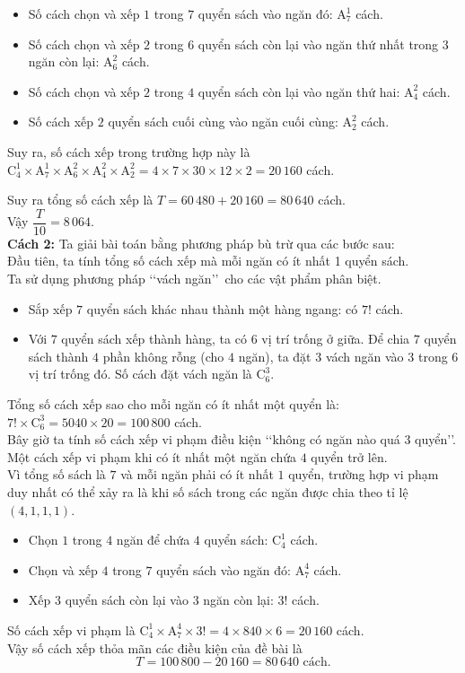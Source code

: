\begin{ex}
{\begin{enumerate}[TH 1.]
\begin{itemize}
\item Số cách chọn và xếp $1$ trong $7$ quyển sách vào ngăn đó: $\mathrm{A}_7^1$ cách.
\item Số cách chọn và xếp $2$ trong $6$ quyển sách còn lại vào ngăn thứ nhất trong $3$ ngăn còn lại: $\mathrm{A}_6^2$ cách.
\item Số cách chọn và xếp $2$ trong $4$ quyển sách còn lại vào ngăn thứ hai: $\mathrm{A}_4^2$ cách.
\item Số cách xếp $2$ quyển sách cuối cùng vào ngăn cuối cùng: $\mathrm{A}_2^2$ cách.
\end{itemize}
Suy ra, số cách xếp trong trường hợp này là $\mathrm{C}_4^1 \times \mathrm{A}_7^1 \times \mathrm{A}_6^2 \times \mathrm{A}_4^2 \times \mathrm{A}_2^2 = 4 \times 7 \times 30 \times 12 \times 2 = 20\,160$ cách.
\end{enumerate}
Suy ra tổng số cách xếp là $T=60\,480 + 20\,160 = 80\,640$ cách.\\
Vậy $\dfrac{T}{10}=8\,064$.\\
\textbf{Cách 2:} Ta giải bài toán bằng phương pháp bù trừ qua các bước sau:\\
Đầu tiên, ta tính tổng số cách xếp mà mỗi ngăn có ít nhất 1 quyển sách.\\
Ta sử dụng phương pháp \lq\lq vách ngăn\rq\rq\ cho các vật phẩm phân biệt.
\begin{itemize}
\item Sắp xếp $7$ quyển sách khác nhau thành một hàng ngang: có $7!$ cách.
\item Với $7$ quyển sách xếp thành hàng, ta có $6$ vị trí trống ở giữa. Để chia $7$ quyển sách thành $4$ phần không rỗng (cho $4$ ngăn), ta đặt $3$ vách ngăn vào $3$ trong $6$ vị trí trống đó. Số cách đặt vách ngăn là $\mathrm{C}_6^3$.
\end{itemize}
Tổng số cách xếp sao cho mỗi ngăn có ít nhất một quyển là: $7! \times \mathrm{C}_6^3 = 5040 \times 20 = 100\,800$ cách.\\
Bây giờ ta tính số cách xếp vi phạm điều kiện \lq\lq không có ngăn nào quá 3 quyển\rq\rq.\\
Một cách xếp vi phạm khi có ít nhất một ngăn chứa $4$ quyển trở lên.\\ Vì tổng số sách là $7$ và mỗi ngăn phải có ít nhất $1$ quyển, trường hợp vi phạm duy nhất có thể xảy ra là khi số sách trong các ngăn được chia theo tỉ lệ $(4, 1, 1, 1)$.
\begin{itemize}
\item Chọn $1$ trong $4$ ngăn để chứa $4$ quyển sách: $\mathrm{C}_4^1$ cách.
\item Chọn và xếp $4$ trong $7$ quyển sách vào ngăn đó: $\mathrm{A}_7^4$ cách.
\item Xếp $3$ quyển sách còn lại vào $3$ ngăn còn lại: $3!$ cách.
\end{itemize}
Số cách xếp vi phạm là $\mathrm{C}_4^1 \times \mathrm{A}_7^4 \times 3! = 4 \times 840 \times 6 = 20\,160$ cách.\\
Vậy số cách xếp thỏa mãn các điều kiện của đề bài là
\[T=100\,800 - 20\,160 = 80\,640 \text{ cách.}\]
}
\end{ex}

